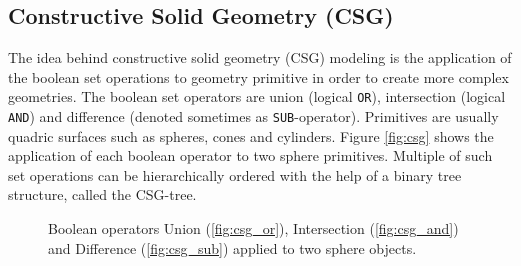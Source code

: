 \subsection{Constructive Solid Geometry (CSG)}

The idea behind constructive solid geometry (CSG) modeling is the application of the boolean set operations to geometry primitive in order to create more complex geometries. The boolean set operators are union (logical \texttt{OR}), intersection (logical \texttt{AND}) and difference (denoted sometimes as \texttt{SUB}-operator). 
Primitives are usually quadric surfaces such as spheres, cones and cylinders. Figure \ref{fig:csg} shows the application of each boolean operator to two sphere primitives. Multiple of such set operations can be hierarchically ordered with the help of a binary tree structure, called the CSG-tree.   

\begin{figure} \label{csg}
	\centering
	\hfill
	\hfill
	\caption{Boolean operators Union (\ref{fig:csg_or}), Intersection (\ref{fig:csg_and}) and Difference (\ref{fig:csg_sub}) applied to two sphere objects.}
\end{figure}

